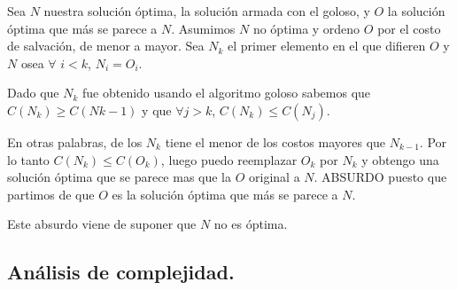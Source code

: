 Sea $N$ nuestra solución óptima, la solución armada con el goloso, y $O$ la solución óptima que más se parece a $N$. Asumimos $N$ no óptima y ordeno $O$ por el costo de salvación, de menor a mayor.
Sea $N_{k}$ el primer elemento en el que difieren $O$ y $N$ osea $\forall$ $i<k$, $N_{i}=O_{i}$.

Dado que $N_{k}$ fue obtenido usando el algoritmo goloso sabemos que $C(N_{k}) \geq C(N{k-1})$ y que $\forall j>k$, $C(N_{k})\leq C(N_{j})$.

En otras palabras, de los $N_{k}$ tiene el menor de los costos mayores que $N_{k-1}$. Por lo tanto $C(N_{k})\leq C(O_{k})$, luego puedo reemplazar $O_{k}$ por $N_{k}$ y obtengo una solución óptima que se parece mas que la $O$ original a $N$. ABSURDO puesto que partimos de que $O$ es la solución óptima que más se parece a $N$.

Este absurdo viene de suponer que $N$ no es óptima.





\newpage
\subsection{Análisis de complejidad.}

\vspace*{0.3cm}

